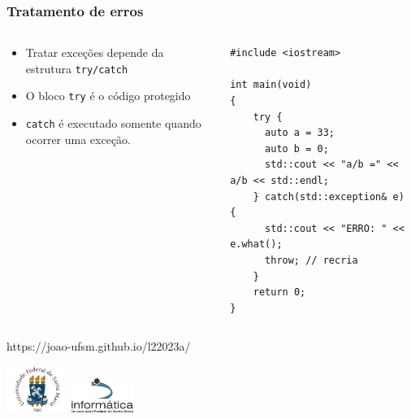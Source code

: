 \documentclass[xcolor={usenames,dvipsnames},10pt,presentation,aspectratio=169]{beamer}
\begin{document}
\begin{frame}[fragile]
  \frametitle{Tratamento de erros}
  \vspace{-2mm}
    \begin{columns}
      \begin{column}{0.4\textwidth}
          \begin{itemize}
            \item Tratar exceções depende da estrutura \texttt{try/catch}
            \item O bloco \texttt{try} é o código protegido
            \item \texttt{catch} é executado somente quando ocorrer uma exceção.
          \end{itemize}
     \end{column}
      \begin{column}{0.6\textwidth}
  \begin{block}{}
\begin{lstlisting}
#include <iostream>

int main(void)
{
    try {
      auto a = 33;
      auto b = 0;
      std::cout << "a/b =" << a/b << std::endl;
    } catch(std::exception& e) {
      std::cout << "ERRO: " << e.what(); 
      throw; // recria
    }
    return 0;
}
\end{lstlisting}
\end{block}
      \end{column}
    \end{columns}
%
\end{frame}
\begin{frame}[plain]{}
  \begin{center}
    \vspace{2cm}
    \Large{https://joao-ufsm.github.io/l22023a/}
    
    \vspace{1cm}
    \includegraphics[width=2cm]{logo_ufsm}
    \hspace{0.5cm}
    \includegraphics[width=2cm]{logo_inf}
  \end{center}
\end{frame}
\end{document}
